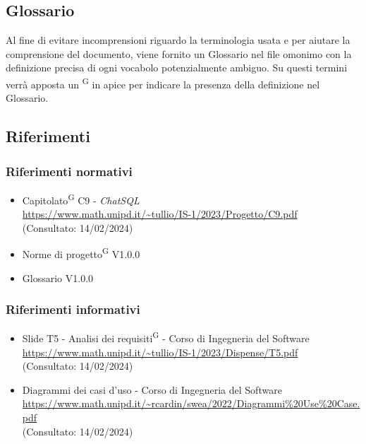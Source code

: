 \subsection{Glossario}
Al fine di evitare incomprensioni riguardo la terminologia usata e per aiutare la comprensione del documento, viene fornito un Glossario nel file omonimo con la definizione precisa di ogni vocabolo potenzialmente ambiguo. Su questi termini verrà apposta un \textsuperscript{G} in apice per indicare la presenza della definizione nel Glossario.

\subsection{Riferimenti}
\subsubsection{Riferimenti normativi}
\begin{itemize}
	\item Capitolato\textsuperscript{G} C9 - \textit{ChatSQL} \\ \url{https://www.math.unipd.it/~tullio/IS-1/2023/Progetto/C9.pdf} \\ (Consultato: 14/02/2024)
	\item Norme di progetto\textsuperscript{G} V1.0.0 
	\item Glossario V1.0.0
\end{itemize}

\subsubsection{Riferimenti informativi}
\begin{itemize}
	\item Slide T5 - Analisi dei requisiti\textsuperscript{G} - Corso di Ingegneria del Software \\ \url{https://www.math.unipd.it/~tullio/IS-1/2023/Dispense/T5.pdf} \\ (Consultato: 14/02/2024)
	\item Diagrammi dei casi d'uso - Corso di Ingegneria del Software \\ \url{https://www.math.unipd.it/~rcardin/swea/2022/Diagrammi%20Use%20Case.pdf} \\ (Consultato: 14/02/2024)
\end{itemize}